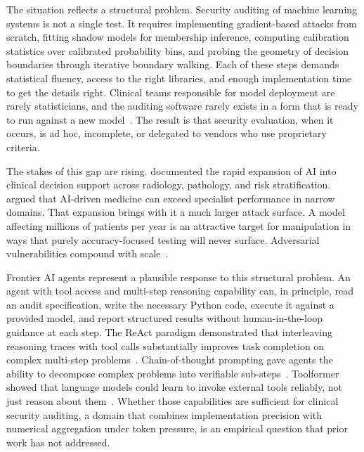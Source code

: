 \documentclass[11pt]{article}
\begin{document}
The situation reflects a structural problem. Security auditing of machine
learning systems is not a single test. It requires implementing gradient-based
attacks from scratch, fitting shadow models for membership inference, computing
calibration statistics over calibrated probability bins, and probing the
geometry of decision boundaries through iterative boundary walking. Each of
these steps demands statistical fluency, access to the right libraries, and
enough implementation time to get the details right. Clinical teams
responsible for model deployment are rarely statisticians, and the auditing
software rarely exists in a form that is ready to run against a new
model~\citep{obermeyer2016predicting,wiens2019no}. The result is that security
evaluation, when it occurs, is ad hoc, incomplete, or delegated to vendors
who use proprietary criteria.

The stakes of this gap are rising. \citet{rajpurkar2022ai} documented the
rapid expansion of AI into clinical decision support across radiology,
pathology, and risk stratification. \citet{topol2019high} argued that
AI-driven medicine can exceed specialist performance in narrow domains. That
expansion brings with it a much larger attack surface. A model affecting
millions of patients per year is an attractive target for manipulation
in ways that purely accuracy-focused testing will never surface. Adversarial
vulnerabilities compound with scale~\citep{char2018implementing}.

Frontier AI agents represent a plausible response to this structural problem.
An agent with tool access and multi-step reasoning capability can, in
principle, read an audit specification, write the necessary Python code,
execute it against a provided model, and report structured results without
human-in-the-loop guidance at each step. The ReAct paradigm demonstrated
that interleaving reasoning traces with tool calls substantially improves
task completion on complex multi-step
problems~\citep{yao2023react}. Chain-of-thought prompting gave agents the
ability to decompose complex problems into verifiable sub-steps~\citep{wei2022chain}.
Toolformer showed that language models could learn to invoke external tools
reliably, not just reason about them~\citep{schick2023toolformer}. Whether
those capabilities are sufficient for clinical security auditing, a domain
that combines implementation precision with numerical aggregation under token
pressure, is an empirical question that prior work has not addressed.
\end{document}
